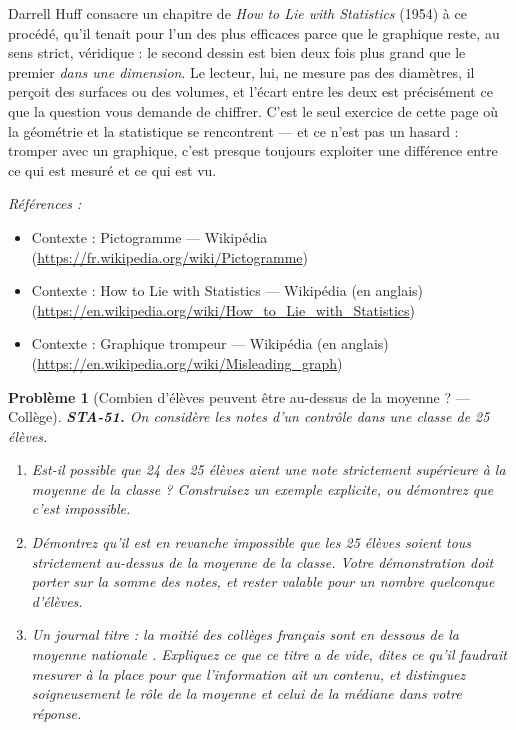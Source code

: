 \documentclass[11pt]{article}
\newtheorem{problem}{Problème}
\newenvironment{refs}{\par\small\noindent\emph{Références :}\begin{itemize}\setlength\itemsep{0pt}}{\end{itemize}\normalsize}
\begin{document}
\noindent Darrell Huff consacre un chapitre de \textit{How to Lie with Statistics} (1954) à
ce procédé, qu'il tenait pour l'un des plus efficaces parce que le graphique reste, au sens strict,
véridique : le second dessin est bien deux fois plus grand que le premier \textit{dans une dimension}.
Le lecteur, lui, ne mesure pas des diamètres, il perçoit des surfaces ou des volumes, et l'écart
entre les deux est précisément ce que la question vous demande de chiffrer. C'est le seul exercice
de cette page où la géométrie et la statistique se rencontrent --- et ce n'est pas un hasard :
tromper avec un graphique, c'est presque toujours exploiter une différence entre ce qui est mesuré
et ce qui est vu.

\begin{refs}
\item Contexte : Pictogramme --- Wikipédia (\url{https://fr.wikipedia.org/wiki/Pictogramme})
\item Contexte : How to Lie with Statistics --- Wikipédia (en anglais) (\url{https://en.wikipedia.org/wiki/How_to_Lie_with_Statistics})
\item Contexte : Graphique trompeur --- Wikipédia (en anglais) (\url{https://en.wikipedia.org/wiki/Misleading_graph})
\end{refs}

\bigskip

\begin{problem}[{Combien d'élèves peuvent être au-dessus de la moyenne ? --- Collège}]
\textbf{STA-51.} On considère les notes d'un contrôle dans une classe de 25 élèves.
\begin{enumerate}
\item[(a)] Est-il possible que 24 des 25 élèves aient une note strictement supérieure à la moyenne de la
classe ? Construisez un exemple explicite, ou démontrez que c'est impossible.
\item[(b)] Démontrez qu'il est en revanche impossible que les 25 élèves soient tous strictement au-dessus
de la moyenne de la classe. Votre démonstration doit porter sur la somme des notes, et rester
valable pour un nombre quelconque d'élèves.
\item[(c)] Un journal titre : \og{} la moitié des collèges français sont en dessous de la moyenne nationale \fg{}.
Expliquez ce que ce titre a de vide, dites ce qu'il faudrait mesurer à la place pour que
l'information ait un contenu, et distinguez soigneusement le rôle de la moyenne et celui de la
médiane dans votre réponse.
\end{enumerate}

\end{problem}
\end{document}
